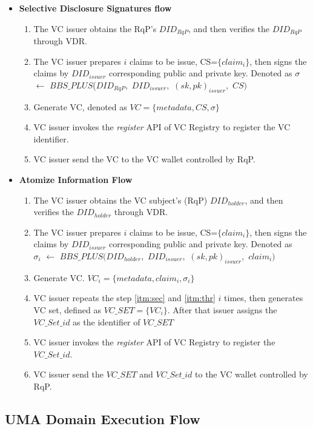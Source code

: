 \documentclass[conference, dvipdfmx]{IEEEtran} %
\begin{document}
\begin{sloppypar}
\begin{itemize}
  \item \textbf{Selective Disclosure Signatures flow}\\
  \begin{enumerate}
    \item The VC issuer obtains the RqP's $DID_{RqP}$, and then verifies the $DID_{RqP}$ through VDR.
    \item 
    The VC issuer prepares $i$ claims to be issue, CS=$\{claim_i\}$, then signs the claims by $DID_{issuer}$ corresponding public and private key.	Denoted as $\sigma$ $\leftarrow$ $BBS\_PLUS$($DID_{RqP},$ $DID_{issuer},$ $(sk,pk)_{issuer},$ $CS)$ 
    \item Generate VC, denoted as $VC = \{metadata,CS, \sigma\}$
    \item VC issuer invokes the \textit{register} API of VC Registry to register the VC identifier.
    \item VC issuer send the VC to the VC wallet controlled by RqP.
  \end{enumerate}
  \item \textbf{Atomize Information Flow}
  \begin{enumerate}
    \item The VC issuer obtains the VC subject's (RqP) $DID_{holder}$, and then verifies the $DID_{holder}$ through VDR.
    \item \label{itm:sec}
    The VC issuer prepares $i$ claims to be issue, CS=$\{claim_i\}$, then signs the claims by $DID_{issuer}$ corresponding public and private key.	Denoted as \\$\sigma_i$ $\leftarrow$ $BBS\_PLUS$$(DID_{holder},$ $DID_{issuer},$ $(sk,pk)_{issuer},$ $claim_i)$
    \item \label{itm:thr} Generate VC. $VC_i = \{metadata, claim_i, \sigma_i\}$
    \item VC issuer repeats the step \ref{itm:sec} and \ref{itm:thr} $i$ times, then generates VC set, defined as  $VC\_SET = \{VC_i\}$. After that issuer assigns the $VC\_Set\_id$ as the identifier of $VC\_SET$
    \item VC issuer invokes the \textit{register} API of VC Registry to register the $VC\_Set\_id$.
    \item VC issuer send the $VC\_SET$ and $VC\_Set\_id$ to the VC wallet controlled by RqP.
  \end{enumerate}
\end{itemize}

\subsection{UMA Domain Execution Flow}


\end{sloppypar}
\end{document}
